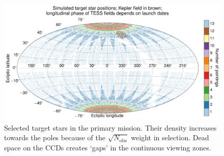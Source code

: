 \begin{figure}[!t] %
	\centering
	\includegraphics{figures/positions_pointings_kepler.pdf}
	\caption{Selected target stars in the primary mission. Their density increases towards the poles because of the $\sqrt{N_\text{obs}}$ weight in selection. Dead space on the CCDs creates `gaps' in the continuous viewing zones.}
	\label{fig:positions_pointings}
\end{figure}
